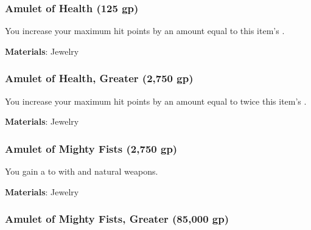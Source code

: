 
\lowercase{\hypertarget{item:Amulet of Health}{}}\label{item:Amulet of Health}
\hypertarget{item:Amulet of Health}{\subsubsection{Amulet of Health\hfill{} (125 gp)}}

You increase your maximum hit points by an amount equal to this item's .



\vspace{0.25em}
\textbf{Materials}: Jewelry


\lowercase{\hypertarget{item:Amulet of Health, Greater}{}}\label{item:Amulet of Health, Greater}
\hypertarget{item:Amulet of Health, Greater}{\subsubsection{Amulet of Health, Greater\hfill{} (2,750 gp)}}

You increase your maximum hit points by an amount equal to twice this item's .



\vspace{0.25em}
\textbf{Materials}: Jewelry


\lowercase{\hypertarget{item:Amulet of Mighty Fists}{}}\label{item:Amulet of Mighty Fists}
\hypertarget{item:Amulet of Mighty Fists}{\subsubsection{Amulet of Mighty Fists\hfill{} (2,750 gp)}}

You gain a   to  with  and natural weapons.



\vspace{0.25em}
\textbf{Materials}: Jewelry


\lowercase{\hypertarget{item:Amulet of Mighty Fists, Greater}{}}\label{item:Amulet of Mighty Fists, Greater}
\hypertarget{item:Amulet of Mighty Fists, Greater}{\subsubsection{Amulet of Mighty Fists, Greater\hfill{} (85,000 gp)}}

